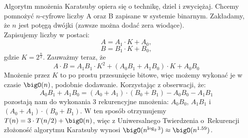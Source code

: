 Algorytm mnożenia Karatsuby opiera się o technikę, dziel i zwyciężaj.
Chcemy pomnożyć \(n\)-cyfrowe liczby A oraz B zapisane w systemie binarnym. Zakładamy, że $n$ jest potęgą dwójki (zawsze można dodać zera wiodące). \\
Zapisujemy liczby w postaci:
\[
    A = A_1 \cdot K + A_0,
\]
\[
    B = B_1 \cdot K + B_0,
\]
gdzie \( K = 2^{\frac{n}{2}} \). Zauważmy teraz, że
\[
    A \cdot B = A_1 B_1 \cdot K^2 + (A_0 B_1 + A_1 B_0) \cdot K + A_0 B_0
\]
Mnożenie przez \( K \) to po prostu przesunięcie bitowe, więc możemy wykonać je w czasie \( \bigO(n) \), podobnie dodawanie. Korzystając z obserwacji, że:
\[
    A_0 B_1 + A_1 B_0 = (A_0 + A_1) \cdot (B_0 + B_1) - A_0 B_0 - A_1 B_1
\]
pozostają nam do wykonania 3 rekurencyjne mnożenia: \( A_0 B_0 \), \( A_1 B_1 \) i \( (A_0 + A_1) \cdot (B_0 + B_1) \). W ten sposób otrzymujemy \( T(n) = 3 \cdot T(n / 2) + \bigO(n) \), więc z Uniwersalnego Twierdzenia o~Rekurencji złożoność algorytmu Karatsuby wynosi \( \bigO(n^{\log_2 3}) \approx \bigO(n^{1.59}) \).
